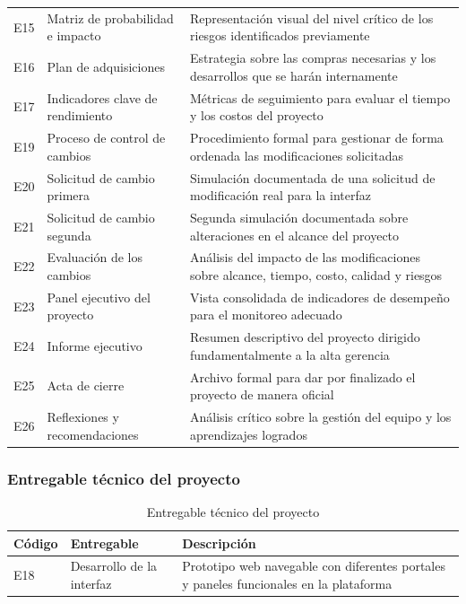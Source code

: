 \documentclass[11pt,spanish]{article}
\begin{document}
\begin{longtable}{L{1.5cm} L{5.8cm} L{7.1cm}}
E15 & Matriz de probabilidad e impacto & Representación visual del nivel crítico de los riesgos identificados previamente \\
E16 & Plan de adquisiciones & Estrategia sobre las compras necesarias y los desarrollos que se harán internamente \\
E17 & Indicadores clave de rendimiento & Métricas de seguimiento para evaluar el tiempo y los costos del proyecto \\
E19 & Proceso de control de cambios & Procedimiento formal para gestionar de forma ordenada las modificaciones solicitadas \\
E20 & Solicitud de cambio primera & Simulación documentada de una solicitud de modificación real para la interfaz \\
E21 & Solicitud de cambio segunda & Segunda simulación documentada sobre alteraciones en el alcance del proyecto \\
E22 & Evaluación de los cambios & Análisis del impacto de las modificaciones sobre alcance, tiempo, costo, calidad y riesgos \\
E23 & Panel ejecutivo del proyecto & Vista consolidada de indicadores de desempeño para el monitoreo adecuado \\
E24 & Informe ejecutivo & Resumen descriptivo del proyecto dirigido fundamentalmente a la alta gerencia \\
E25 & Acta de cierre & Archivo formal para dar por finalizado el proyecto de manera oficial \\
E26 & Reflexiones y recomendaciones & Análisis crítico sobre la gestión del equipo y los aprendizajes logrados \\
\bottomrule
\end{longtable}

\subsubsection{Entregable técnico del proyecto}
\vspace{-1.5em}
\begin{table}[H]
\centering
\caption{Entregable técnico del proyecto}
\label{tab:entregable-tecnico}
{\small
\begin{tabularx}{\textwidth}{L{1.5cm} L{4.8cm} Y}
\toprule
\textbf{Código} & \textbf{Entregable} & \textbf{Descripción} \\
\midrule
E18 & Desarrollo de la interfaz & Prototipo web navegable con diferentes portales y paneles funcionales en la plataforma \\
\bottomrule
\end{tabularx}
}
\end{table}
\end{document}
